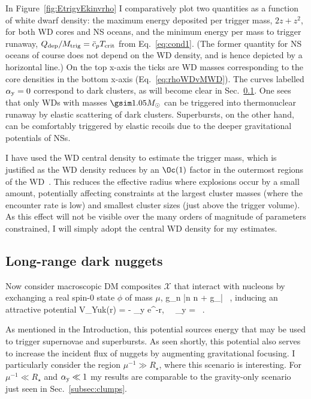 \documentclass[
    twocolumn,
	prd,
        amssymb,
	preprintnumbers,
	secnumarabic,
	nofootinbib,
	superscriptaddress]{revtex4-1}
\begin{document}
In Figure~\ref{fig:EtrigvEkinvrho} I comparatively plot two quantities as a function of white dwarf density: the maximum energy deposited per trigger mass, $2 z + z^2$, for both WD cores and NS oceans, and the minimum energy per mass to trigger runaway, $Q_{\rm dep}/M_{\rm trig} = \bar c_p T_{\rm crit}$ from Eq.~\eqref{eq:cond1}. 
(The former quantity for NS oceans of course does not depend on the WD density, and is hence depicted by a horizontal line.)
On the top x-axis the ticks are WD masses corresponding to the core densities in the bottom x-axis (Eq.~\eqref{eq:rhoWDvMWD}).
The curves labelled $\alpha_{\rm y} = 0$ correspond to dark clusters, as will become clear in Sec.~\ref{subsec:nuggets}.
One sees that only WDs with masses $\gsim 1.05 M_\odot$ can be triggered into thermonuclear runaway by elastic scattering of dark clusters.
Superbursts, on the other hand, can be comfortably triggered by elastic recoils due to the deeper gravitational potentials of NSs.

I have used the WD central density to estimate the trigger mass, which is justified as the WD density reduces by an $\Oc(1)$ factor in the outermost regions of the WD~\cite{BellImprovedWD:2021fye}. 
This reduces the effective radius where explosions occur by a small amount, potentially affecting constraints at the largest cluster masses (where the encounter rate is low) and smallest cluster sizes (just above the trigger volume). 
As this effect will not be visible over the many orders of magnitude of parameters constrained, I will simply adopt the central WD density for my estimates.

 \subsection{Long-range dark nuggets}
 \label{subsec:nuggets}

Now consider macroscopic DM composites $\mathcal{X}$ that interact with nucleons by exchanging a real spin-0 state $\phi$ of mass $\mu$, 
\beq
{} \supset g_n \phi \bar n n + g_\chi \phi \bar{} ~,
\label{eq:Lag}
\eeq
inducing an attractive potential
\beq
V_{\rm Yuk}(r) =  - \alpha_{\rm y}  e^{-\mu r}, \ \  \alpha_{\rm y}  = ~.
\label{eq:VYuk}
\eeq

As mentioned in the Introduction, this potential sources energy that may be used to trigger supernovae and superbursts.
As seen shortly, this potential also serves to increase the incident flux of nuggets by augmenting gravitational focusing.
I particularly consider the region $\mu^{-1} \gg R_\star$, where this scenario is interesting. 
For $\mu^{-1} \ll R_\star$ and $\alpha_{\rm y} \ll 1$ my results are comparable to the gravity-only scenario just seen in Sec.~\ref{subsec:clumps}. 
\end{document}
